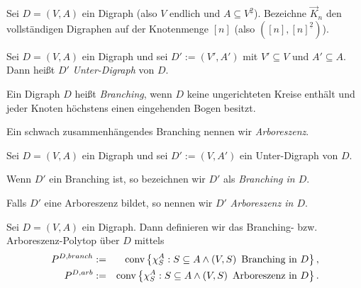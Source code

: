 \documentclass[10p,a4paper,BCOR = 12mm, DIV=15]{scrbook}
\begin{document}
\label{sec:branch_arb}

\begin{Def}
Sei $D=\left(V, A\right)$ ein Digraph (also $V$ endlich und $A \subseteq V^{\underline{2}}$). Bezeichne $\vec{K}_n$ den vollständigen Digraphen auf der Knotenmenge $\left[n\right]$ (also $\left(\left[n\right], \left[n\right]^{\underline{2}}\right)$).
\end{Def}

\begin{Def}
Sei $D=\left(V, A\right)$ ein Digraph und sei $D':=\left(V', A'\right)$ mit $V'\subseteq V$ und $A' \subseteq A$. Dann heißt $D'$ \emph{Unter-Digraph} von $D$.
\end{Def}

\begin{Def}
Ein Digraph $D$ heißt \emph{Branching}, wenn $D$ keine ungerichteten Kreise enthält und jeder Knoten höchstens einen eingehenden Bogen besitzt.

Ein schwach zusammenhängendes Branching nennen wir \emph{Arboreszenz}.
\end{Def}

\begin{Def}
Sei $D=\left(V, A\right)$ ein Digraph und sei $D':=\left(V, A'\right)$ ein Unter-Digraph von $D$.

Wenn $D'$ ein Branching ist, so bezeichnen wir $D'$ als \emph{Branching in $D$}.

Falls $D'$ eine Arboreszenz bildet, so nennen wir $D'$ \emph{Arboreszenz in $D$}.
\end{Def}

\begin{Def}
Sei $D=\left(V, A\right)$ ein Digraph. Dann definieren wir das Branching- bzw. Arbores\-zenz-Polytop über $D$ mittels
\begin{eqnarray*}
P^{D, branch} & := & \operatorname{conv} \left\{\chi^A_{S}: S \subseteq A \wedge \left(V, S\right) \textnormal{ Branching in }D\right\}, \\
P^{D, arb} & := & \operatorname{conv} \left\{\chi^A_{S}: S \subseteq A \wedge \left(V, S\right) \textnormal{ Arboreszenz in }D\right\}.
\end{eqnarray*}
\end{Def}
\end{document}
